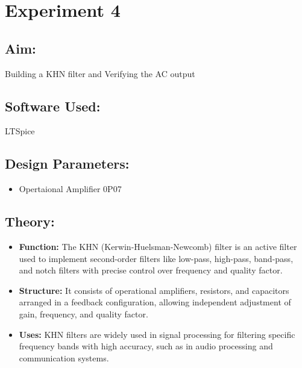 \documentclass[a4paper,12pt]{report}
\begin{document}
  \newpage

\section{Experiment 4}

  \subsection{Aim:}
    \hspace{20pt}Building a KHN filter and Verifying the AC output

  \vspace{0.3cm} %

  \subsection{Software Used:} 
    \hspace{20pt}LTSpice

  \vspace{0.3cm}

  \subsection{Design Parameters:}
    \begin{itemize}
        \item Opertaional Amplifier 0P07
    \end{itemize}

  \vspace{0.3cm}

  \subsection{Theory:} 
    \begin{itemize}
        \item \textbf{Function:} The KHN (Kerwin-Huelsman-Newcomb) filter is an active filter used to implement second-order filters like low-pass, high-pass, band-pass, and notch filters with precise control over frequency and quality factor.
        \item \textbf{Structure:} It consists of operational amplifiers, resistors, and capacitors arranged in a feedback configuration, allowing independent adjustment of gain, frequency, and quality factor.
        \item \textbf{Uses:} KHN filters are widely used in signal processing for filtering specific frequency bands with high accuracy, such as in audio processing and communication systems.
    \end{itemize}
\end{document}
